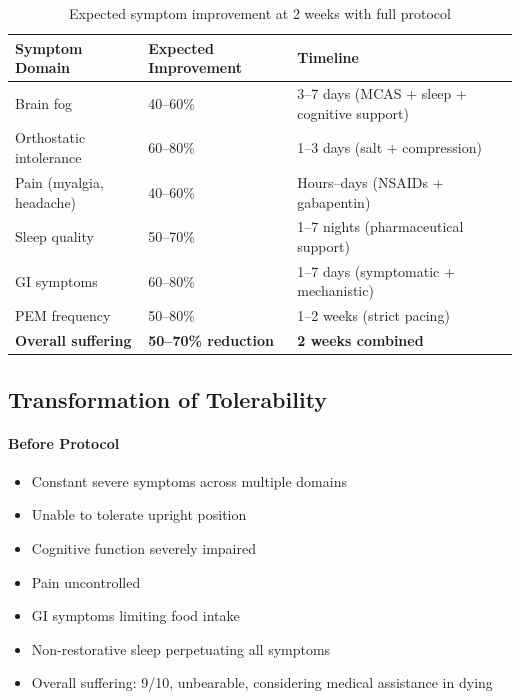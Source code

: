 \begin{table}[h]
\centering
\caption{Expected symptom improvement at 2 weeks with full protocol}
\label{tab:two-week-relief}
\begin{tabular}{lll}
\toprule
\textbf{Symptom Domain} & \textbf{Expected Improvement} & \textbf{Timeline} \\
\midrule
Brain fog & 40--60\% & 3--7 days (MCAS + sleep + cognitive support) \\
Orthostatic intolerance & 60--80\% & 1--3 days (salt + compression) \\
Pain (myalgia, headache) & 40--60\% & Hours--days (NSAIDs + gabapentin) \\
Sleep quality & 50--70\% & 1--7 nights (pharmaceutical support) \\
GI symptoms & 60--80\% & 1--7 days (symptomatic + mechanistic) \\
PEM frequency & 50--80\% & 1--2 weeks (strict pacing) \\
\midrule
\textbf{Overall suffering} & \textbf{50--70\% reduction} & \textbf{2 weeks combined} \\
\bottomrule
\end{tabular}
\end{table}

\subsection{Transformation of Tolerability}

\paragraph{Before Protocol}
\begin{itemize}
    \item Constant severe symptoms across multiple domains
    \item Unable to tolerate upright position
    \item Cognitive function severely impaired
    \item Pain uncontrolled
    \item GI symptoms limiting food intake
    \item Non-restorative sleep perpetuating all symptoms
    \item Overall suffering: 9/10, unbearable, considering medical assistance in dying
\end{itemize}

